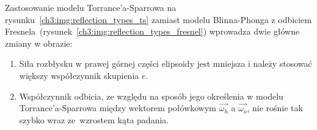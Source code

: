 Zastosowanie modelu Torrance'a-Sparrowa na rysunku~\ref{ch3:img:reflection_types_ts} zamiast modelu Blinna-Phonga z odbiciem Fresnela~(rysunek~\ref{ch3:img:reflection_types_fresnel}) wprowadza dwie główne zmiany w obrazie:
\begin{enumerate}
\item Siła rozbłysku w prawej górnej części elipsoidy jest mniejsza i należy stosować większy współczynnik skupienia $e$.
\item Współczynnik odbicia, ze względu na sposób jego określenia w modelu Torrance'a-Sparrowa między wektorem połówkowym $\vec{\omega_h}$ a $\vec{\omega_o}$, nie rośnie tak szybko wraz ze~wzrostem kąta padania.   
\end{enumerate}

\begin{figure}[H]
\centering




\end{figure}
